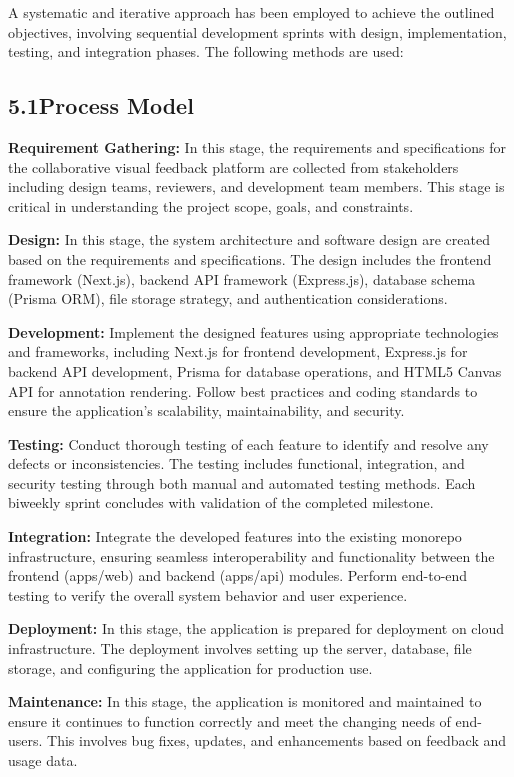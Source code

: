 \documentclass[12pt,a4paper]{article}
\begin{document}
A systematic and iterative approach has been employed to achieve the outlined objectives, involving sequential development sprints with design, implementation, testing, and integration phases. The following methods are used:

\subsection{5.1\quad Process Model}

\textbf{Requirement Gathering:} In this stage, the requirements and specifications for the collaborative visual feedback platform are collected from stakeholders including design teams, reviewers, and development team members. This stage is critical in understanding the project scope, goals, and constraints.

\textbf{Design:} In this stage, the system architecture and software design are created based on the requirements and specifications. The design includes the frontend framework (Next.js), backend API framework (Express.js), database schema (Prisma ORM), file storage strategy, and authentication considerations.

\textbf{Development:} Implement the designed features using appropriate technologies and frameworks, including Next.js for frontend development, Express.js for backend API development, Prisma for database operations, and HTML5 Canvas API for annotation rendering. Follow best practices and coding standards to ensure the application's scalability, maintainability, and security.

\textbf{Testing:} Conduct thorough testing of each feature to identify and resolve any defects or inconsistencies. The testing includes functional, integration, and security testing through both manual and automated testing methods. Each biweekly sprint concludes with validation of the completed milestone.

\textbf{Integration:} Integrate the developed features into the existing monorepo infrastructure, ensuring seamless interoperability and functionality between the frontend (apps/web) and backend (apps/api) modules. Perform end-to-end testing to verify the overall system behavior and user experience.

\textbf{Deployment:} In this stage, the application is prepared for deployment on cloud infrastructure. The deployment involves setting up the server, database, file storage, and configuring the application for production use.

\textbf{Maintenance:} In this stage, the application is monitored and maintained to ensure it continues to function correctly and meet the changing needs of end-users. This involves bug fixes, updates, and enhancements based on feedback and usage data.
\end{document}

